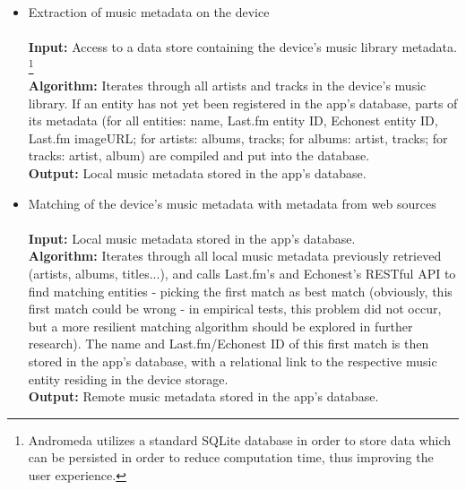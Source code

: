 \begin{itemize}
	\item Extraction of music metadata on the device \\\\
			\textbf{Input:} Access to a data store containing the device's music library metadata. \footnote{Andromeda utilizes a standard SQLite database in order to store data which can be persisted in order to reduce computation time, thus improving the user experience.}
			  \\
			\textbf{Algorithm:} Iterates through all artists and tracks in the device's music library.
			If an entity has not yet been registered in the app's database, parts of its metadata (for all entities: name, Last.fm entity ID, Echonest entity ID, Last.fm imageURL; for artists: albums, tracks; for albums: artist, tracks; for tracks: artist, album) are compiled and put into the database. \\
			\textbf{Output:} Local music metadata stored in the app's database.\\
			
	\item Matching of the device's music metadata with metadata from web sources \\\\
			\textbf{Input:} Local music metadata stored in the app's database.  \\
			\textbf{Algorithm:} Iterates through all local music metadata previously retrieved (artists, albums, titles...), and calls	Last.fm's and Echonest's RESTful API to find matching entities - picking the first match as best match (obviously, this first match could be wrong - in empirical tests, this problem did not occur, but a more resilient matching algorithm should be explored in further research). The name and Last.fm/Echonest ID of this first match is then stored in the app's database, with a relational link to the respective music entity residing in the device storage. \\
			\textbf{Output:} Remote music metadata stored in the app's database. \\
			

\end{itemize}
